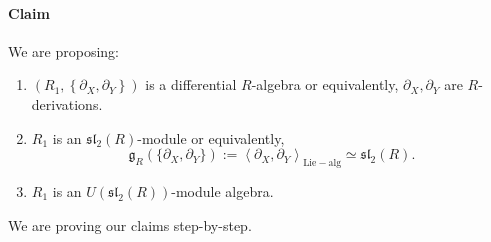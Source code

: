 \documentclass[10pt,a4paper]{article}
\begin{document}
\paragraph{Claim}
We are proposing:
\begin{enumerate}
\item\label{claim01} $\left(R_1, \left\{\partial_X,\partial_Y\right\}\right)$ is a differential $R$-algebra or equivalently, $\partial_X, \partial_Y$ are $R$-derivations.
\item\label{claim02} $R_1$ is an $\mathfrak{sl}_2(R)$-module or equivalently, $$\mathfrak{g}_R(\{\partial_X, \partial_Y\}) := \left<\partial_X, \partial_Y\right>_{\mathrm{Lie-alg}} \simeq \mathfrak{sl}_2(R).$$
\item\label{claim03} $R_1$ is an $U(\mathfrak{sl}_2(R))$-module algebra.
\end{enumerate}
We are proving our claims step-by-step.
\end{document}

